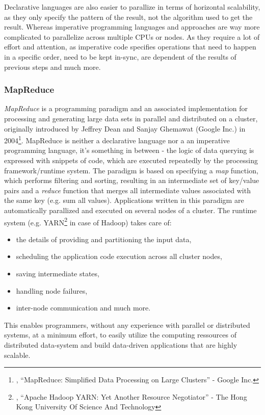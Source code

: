 {Declarative languages are also easier to parallize in terms of horizontal scalability, as they only specify the pattern of the result, not the algorithm used to get the result. Whereas imperative programming languages and approaches are way more complicated to parallelize across multiple CPUs or nodes. As they require a lot of effort and attention, as imperative code specifies operations that need to happen in a specific order, need to be kept in-sync, are dependent of the results of previous steps and much more.\\


\subsubsection{MapReduce}
\label{tf_dma_dataaccess_mr}
\textit{MapReduce} is a programming paradigm and an associated implementation for processing and generating large data sets in parallel and distributed on a cluster, originally introduced by Jeffrey Dean and Sanjay Ghemawat (Google Inc.) in 2004\footnote{\cite{GOOMR}, ``MapReduce: Simplified Data Processing on Large Clusters'' - Google Inc.}. MapReduce is neither a declarative language nor a an imperative programming language, it's something in between - the logic of data querying is expressed with snippets of code, which are executed repeatedly by the processing framework/runtime system. 
The paradigm is based on specifying a \textit{map} function, which performs filtering and sorting, resulting in an intermediate set of key/value pairs and a \textit{reduce} function that merges all intermediate values associated with the same key (e.g. sum all values).
Applications written in this paradigm are automatically parallized and executed on several nodes of a cluster. The runtime system (e.g. YARN\footnote{\cite{YARNPP}, ``Apache Hadoop YARN: Yet Another Resource Negotiator'' - The Hong Kong University Of Science And Technology} in case of Hadoop) takes care of: 
\begin{samepage}
\begin{itemize}
\item the details of providing and partitioning the input data, 
\item scheduling the application code execution across all cluster nodes, 
\item saving intermediate states,
\item handling node failures,
\item inter-node communication and much more.\\
\end{itemize}
\end{samepage}
This enables programmers, without any experience with parallel or distributed systems, at a minimum effort, to easily utilize the computing ressources of distributed data-system and build data-driven applications that are highly scalable. \\

}
